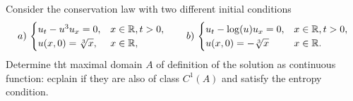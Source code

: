 \newpage
\begin{exercise}
    Consider the conservation law with two different initial conditions
    \begin{equation*}
        a)\,\begin{cases}
            u_t - u^3 u_x = 0, & x \in \mathbb{R}, t > 0, \\
            u(x,0) = \sqrt[3]{x}, & x \in \mathbb{R},
        \end{cases}
        \qquad 
        b)\,\begin{cases}
            u_t - \log(u) u_x = 0, & x \in \mathbb{R}, t > 0, \\
            u(x,0) = -\sqrt[3]{x} & x \in \mathbb{R}.
        \end{cases}
    \end{equation*}
    Determine tht maximal domain \(A\) of definition of the solution as continuous function: ecplain if they are also of class \(C^1(A)\) and satisfy the entropy condition.
\end{exercise}
